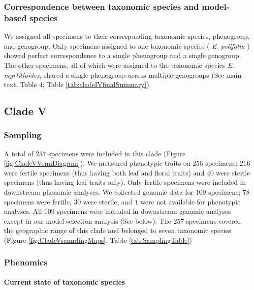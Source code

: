 \documentclass[
  11pt,
]{article}
\begin{document}
\hypertarget{correspondence-between-taxonomic-species-and-model-based-species-3}{%
\subsubsection{Correspondence between taxonomic species and model-based species}\label{correspondence-between-taxonomic-species-and-model-based-species-3}}

We assigned all specimens to their corresponding taxonomic species, phenogroup, and genogroup. Only specimens assigned to one taxonomic species ( \emph{E. polifolia} ) showed perfect correspondence to a single phenogroup and a single genogroup. The other specimens, all of which were assigned to the taxonomic species \emph{E. myrtilloides}, shared a single phenogroup across multiple genogroups (See main text, Table 4; Table \ref{tab:cladeIVfinalSummary}).

\hypertarget{clade-v}{%
\subsection{Clade V}\label{clade-v}}

\hypertarget{sampling-5}{%
\subsubsection{Sampling}\label{sampling-5}}

A total of \(257\) specimens were included in this clade (Figure \ref{fig:CladeVVennDiagram}). We measured phenotypic traits on \(256\) specimens; \(216\) were fertile specimens (thus having both leaf and floral traits) and \(40\) were sterile specimens (thus having leaf traits only). Only fertile specimens were included in downstream phenomic analyses. We collected genomic data for \(109\) specimens; \(78\) specimens were fertile, \(30\) were sterile, and \(1\) were not available for phenotypic analyses. All \(109\) specimens were included in downstream genomic analyses except in our model selection analysis (See below). The \(257\) specimens covered the geographic range of this clade and belonged to seven taxonomic species (Figure \ref{fig:CladeVsamplingMaps}, Table \ref{tab:SamplingTable})

\hypertarget{phenomics-5}{%
\subsubsection{Phenomics}\label{phenomics-5}}

\hypertarget{current-state-of-taxonomic-species-4}{%
\paragraph{Current state of taxonomic species}\label{current-state-of-taxonomic-species-4}}
\end{document}
